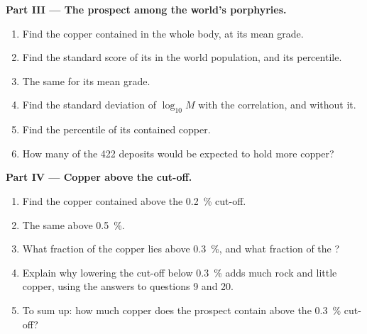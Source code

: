 \begin{problem}
\noindent\textbf{Part III --- The prospect among the world's porphyries.}
\begin{enumerate}[resume]
  \item Find the copper contained in the whole body, at its mean grade.
  \item Find the standard score of its  in the world population, and its percentile.
  \item The same for its mean grade.
  \item Find the standard deviation of $\log_{10} M$ with the correlation, and without it.
  \item Find the percentile of its contained copper.
  \item How many of the 422 deposits would be expected to hold more copper?
\end{enumerate}

\noindent\textbf{Part IV --- Copper above the cut-off.}
\begin{enumerate}[resume]
  \item Find the copper contained above the \qty{0.2}{\percent} cut-off.
  \item The same above \qty{0.5}{\percent}.
  \item What fraction of the copper lies above \qty{0.3}{\percent}, and what fraction of the
        ?
  \item Explain why lowering the cut-off below \qty{0.3}{\percent} adds much rock and little
        copper, using the answers to questions 9 and 20.
  \item To sum up: how much copper does the prospect contain above the \qty{0.3}{\percent} cut-off?
\end{enumerate}
\end{problem}
